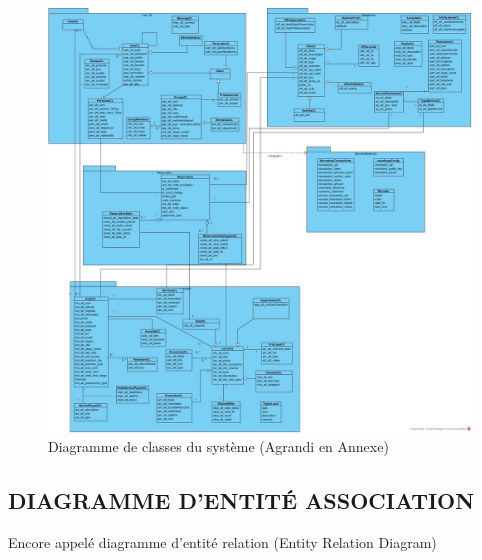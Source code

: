 \begin{figure}[!htbp]
	\begin{center}
		\includegraphics[scale=0.35]{images/diag_classe.jpg}
		\caption{Diagramme de classes du système (Agrandi en Annexe)}
		\label{classe_diagramme}
	\end{center}
\end{figure}
\cleardoublepage
\subsection{DIAGRAMME D'ENTITÉ ASSOCIATION}

Encore appelé diagramme d’entité relation (Entity Relation Diagram)

